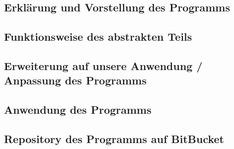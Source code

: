 \documentclass[twoside,a4paper,draft]{article}
\begin{document}
\begin{multicols}{2}
\section{Erklärung und Vorstellung des Programms}

\subsection{Funktionsweise des abstrakten Teils}

\subsection{Erweiterung auf unsere Anwendung / Anpassung des Programms}

\subsection{Anwendung des Programms}

\subsection{Repository des Programms auf BitBucket}

\end{multicols}
\end{document}

